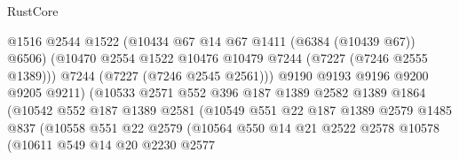 \begin{lexlean}{RustCore}
\begin{coremodule}
                                    @1516
                                    @2544
                                    @1522
                                    (@10434 @67 @14 @67 @1411 (@6384 (@10439 @67)) @6506)
                                    (@10470
                                      @2554
                                      @1522
                                      @10476
                                      @10479
                                      @7244
                                      (@7227 (@7246 @2555 @1389)))
                                    @7244
                                    (@7227 (@7246 @2545 @2561)))
                                  @9190
                                  @9193
                                  @9196
                                  @9200
                                  @9205
                                  @9211)
                                (@10533
                                  @2571
                                  @552
                                  @396
                                  @187
                                  @1389
                                  @2582
                                  @1389
                                  @1864
                                  (@10542
                                    @552
                                    @187
                                    @1389
                                    @2581
                                    (@10549
                                      @551
                                      @22
                                      @187
                                      @1389
                                      @2579
                                      @1485
                                      @837
                                      (@10558
                                        @551
                                        @22
                                        @2579
                                        (@10564
                                          @550
                                          @14
                                          @21
                                          @2522
                                          @2578
                                          @10578
                                          (@10611
                                            @549
                                            @14
                                            @20
                                            @2230
                                            @2577

\end{coremodule}
\end{lexlean}
